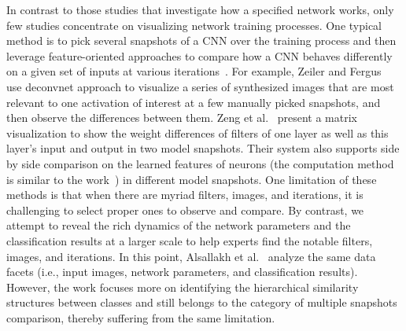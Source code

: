 \documentclass[format=acmsmall, review=false, screen=true]{acmart}
\newcommand{\ti}{\textcolor[rgb]{0,0,0}}
\begin{document}
In contrast to those studies that investigate how a specified network works, only few studies concentrate on visualizing network training processes.
One typical method is to pick several snapshots of a CNN over the training process and then leverage feature-oriented approaches to compare how a CNN behaves differently on a given set of inputs at various iterations~\cite{zeiler2014visualizing, chung2016revacnn, zeng2017cnncomparator, alsallakh2018convolutional}.
For example, Zeiler and Fergus~\cite{zeiler2014visualizing} use deconvnet approach to visualize a series of synthesized images that are most relevant to one activation of interest at a few manually picked snapshots, and then observe the differences between them.
\ti{
Zeng et al.~\cite{zeng2017cnncomparator} present a matrix visualization to show the weight differences of filters of one layer as well as this layer's input and output in two model snapshots. Their system also supports side by side comparison on the learned features of neurons (the computation method is similar to the work~\cite{girshick2014rich}) in different model snapshots.
One limitation of these methods is that when there are myriad filters, images, and iterations, it is challenging to select proper ones to observe and compare.
By contrast, we attempt to reveal the rich dynamics of the network parameters and the classification results at a larger scale to help experts find the notable filters, images, and iterations.
In this point, Alsallakh et al.~\cite{alsallakh2018convolutional} analyze the same data facets (i.e., input images, network parameters, and classification results). However, the work focuses more on identifying the hierarchical similarity structures between classes and still belongs to the category of multiple snapshots comparison, thereby suffering from the same limitation.
}
\end{document}
